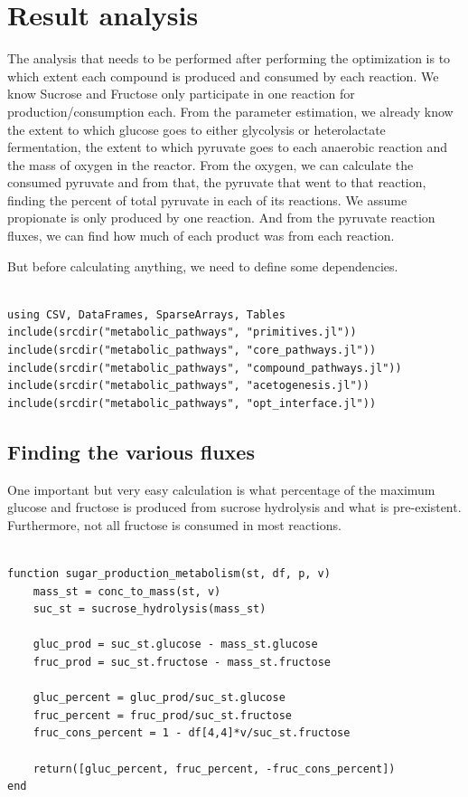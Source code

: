 \documentclass[11pt]{article}
\begin{document}
\section{Result analysis}
\label{sec:org4fb7173}
The analysis that needs to be performed after performing the optimization is to which extent each compound is produced and consumed by each reaction. We know Sucrose and Fructose only participate in one reaction for production/consumption each. From the parameter estimation, we already know the extent to which glucose goes to either glycolysis or heterolactate fermentation, the extent to which pyruvate goes to each anaerobic reaction and the mass of oxygen in the reactor. From the oxygen, we can calculate the consumed pyruvate and from that, the pyruvate that went to that reaction, finding the percent of total pyruvate in each of its reactions. We assume propionate is only produced by one reaction. And from the pyruvate reaction fluxes, we can find how much of each product was from each reaction.

But before calculating anything, we need to define some dependencies.

\begin{verbatim}

using CSV, DataFrames, SparseArrays, Tables
include(srcdir("metabolic_pathways", "primitives.jl"))
include(srcdir("metabolic_pathways", "core_pathways.jl"))
include(srcdir("metabolic_pathways", "compound_pathways.jl"))
include(srcdir("metabolic_pathways", "acetogenesis.jl"))
include(srcdir("metabolic_pathways", "opt_interface.jl"))
\end{verbatim}

\subsection{Finding the various fluxes}
\label{sec:org0a3f579}
One important but very easy calculation is what percentage of the maximum glucose and fructose is produced from sucrose hydrolysis and what is pre-existent. Furthermore, not all fructose is consumed in most reactions.

\begin{verbatim}

function sugar_production_metabolism(st, df, p, v)
    mass_st = conc_to_mass(st, v)
    suc_st = sucrose_hydrolysis(mass_st)

    gluc_prod = suc_st.glucose - mass_st.glucose
    fruc_prod = suc_st.fructose - mass_st.fructose

    gluc_percent = gluc_prod/suc_st.glucose
    fruc_percent = fruc_prod/suc_st.fructose
    fruc_cons_percent = 1 - df[4,4]*v/suc_st.fructose

    return([gluc_percent, fruc_percent, -fruc_cons_percent])
end
\end{verbatim}
\end{document}
